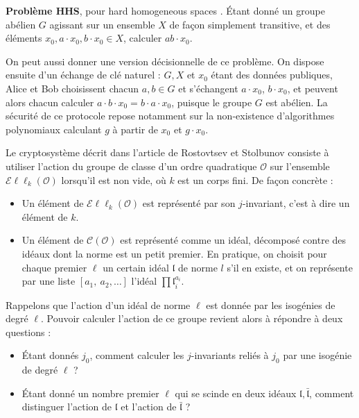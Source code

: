 \documentclass[11pt,a4paper]{article}
\renewcommand{\O}{\mathcal{O}}
\newcommand{\Cl}{\mathcal{C}}
\newcommand{\Ell}{\mathcal{E}\ell\ell}
\renewcommand{\frak}{\mathfrak}
\theoremstyle{definition}
\begin{document}
\textbf{Problème HHS}, pour \og hard homogeneous spaces \fg. \'Etant donné un groupe abélien $G$ agissant sur un ensemble $X$ de façon simplement transitive, et des éléments $x_0, a\cdot x_0, b\cdot x_0\in X$, calculer $ab\cdot x_0$.

On peut aussi donner une version décisionnelle de ce problème. On dispose ensuite d'un échange de clé naturel : $G, X$ et $x_0$ étant des données publiques, Alice et Bob choisissent chacun $a,b\in G$ et s'échangent $a\cdot x_0$, $b\cdot x_0$, et peuvent alors chacun calculer $a\cdot b\cdot x_0=b\cdot a\cdot x_0$, puisque le groupe $G$ est abélien. La sécurité de ce protocole repose notamment sur la non-existence d'algorithmes polynomiaux calculant $g$ à partir de $x_0$ et $g\cdot x_0$.

\vspace{5mm}

Le cryptosystème décrit dans l'article de Rostovtsev et Stolbunov consiste à utiliser l'action du groupe de classe d'un ordre quadratique $\O$ sur l'ensemble $\Ell_k(\O)$ lorsqu'il est non vide, où $k$ est un corps fini. De façon concrète :

\begin{itemize}

\item Un élément de $\Ell_k(\O)$ est représenté par son $j$-invariant, c'est à dire un élément de $k$.
\item Un élément de $\Cl(\O)$ est représenté comme un idéal, décomposé contre des idéaux dont la norme est un petit premier. En pratique, on choisit pour chaque premier $\ell$ un certain idéal $\frak l$ de norme $l$ s'il en existe, et on représente par une liste $[a_1,\ a_2,\dots]$ l'idéal $\prod {\frak l}_i^{a_i}$.

\end{itemize}

Rappelons que l'action d'un idéal de norme $\ell$ est donnée par les isogénies de degré $\ell$. Pouvoir calculer l'action de ce groupe revient alors à répondre à deux questions :

\begin{itemize}

\item \'Etant donnés $j_0$, comment calculer les $j$-invariants reliés à $j_0$ par une isogénie de degré $\ell$ ?
\item \'Etant donné un nombre premier $\ell$ qui se scinde en deux idéaux $\frak l,\bar{\frak l}$, comment distinguer l'action de $\frak l$ et l'action de $\bar{\frak l}$ ?

\end{itemize}
\end{document}
